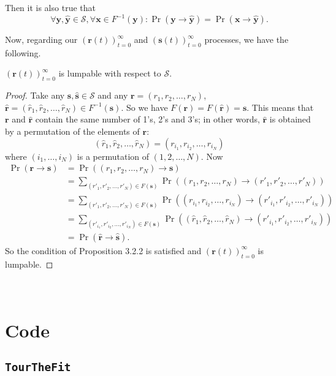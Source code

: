 \begin{appendices}
Then it is also true that  
\[
\forall \bm{y}, \hat{\bm{y}} \in \mathcal S, \forall \bm{x} \in F^{-1}(\bm{y}) : \Pr(\bm{y} \rightarrow \hat{\bm{y}}) = \Pr(\bm{x} \rightarrow \hat{\bm{y}}).
\]

Now, regarding our \((\bm{r}(t))_{t=0}^{\infty}\) and \((\bm{s}(t))_{t=0}^{\infty}\) processes, we have the following.

\((\bm{r}(t))_{t=0}^{\infty}\) is lumpable with respect to \(\mathcal S\).

\begin{proof}
Take any \(\bm{s}, \hat{\bm{s}} \in \mathcal S\) and any \(\bm{r} = (r_1, r_2, \ldots, r_N)\), \(\hat{\bm{r}} = (\hat{r}_1, \hat{r}_2, \ldots, \hat{r}_N) \in F^{-1}(\bm{s})\). So we have \(F(\bm{r}) = F(\hat{\bm{r}}) = \bm{s}\). This means that \(\bm{r}\) and \(\hat{\bm{r}}\) contain the same number of 1's, 2's and 3's; in other words, \(\hat{\bm{r}}\) is obtained by a permutation of the elements of \(\bm{r}\):
\[
(\hat{r}_1, \hat{r}_2, \ldots, \hat{r}_N) = (r_{i_1}, r_{i_2}, \ldots, r_{i_N})
\]
where \((i_1, \ldots, i_N)\) is a permutation of \((1, 2, \ldots, N)\). Now
\begin{align*}
\Pr(\bm{r} \rightarrow {\bm{s}}) &= \Pr((r_1, r_2, \ldots, r_N) \rightarrow {\bm{s}}) \\
&= \sum_{(r'_1,r'_2,\ldots,r'_N) \in F({\bm{s}})} \Pr((r_1, r_2, \ldots, r_N) \rightarrow (r'_1, r'_2, \ldots, r'_N)) \\
&= \sum_{(r'_1,r'_2,\ldots,r'_N) \in F(\bm{s})} \Pr\left((r_{i_1}, r_{i_2}, \ldots, r_{i_N}) \rightarrow (r'_{i_1}, r'_{i_2}, \ldots, r'_{i_N})\right) \\
&= \sum_{(r'_{i_1},r'_{i_2},\ldots,r'_{i_N}) \in F({\bm{s}})} \Pr\left((\hat{r}_1, \hat{r}_2, \ldots, \hat{r}_N) \rightarrow (r'_{i_1}, r'_{i_2}, \ldots, r'_{i_N})\right) \\
&= \Pr(\hat{\bm{r}} \rightarrow \hat{\bm{s}}).
\end{align*}
So the condition of Proposition 3.2.2 is satisfied and \((\bm{r}(t))_{t=0}^{\infty}\) is lumpable.
\end{proof}
\newpage
\section{\\Code	}

\subsection*{\texttt{TourTheFit}}


\end{appendices}
